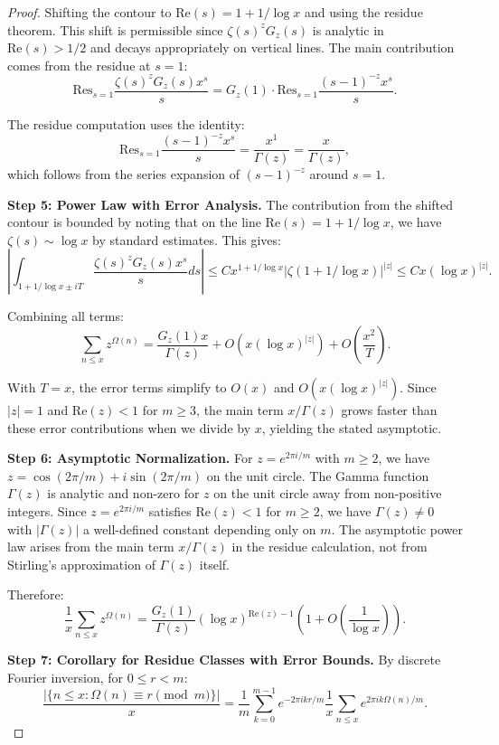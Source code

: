\documentclass[12pt]{article}
\theoremstyle{definition}
\theoremstyle{remark}
\begin{document}
\begin{proof}
Shifting the contour to $\mathrm{Re}(s) = 1 + 1/\log x$ and using the residue theorem. This shift is permissible since $\zeta(s)^z G_z(s)$ is analytic in $\mathrm{Re}(s) > 1/2$ and decays appropriately on vertical lines. The main contribution comes from the residue at $s=1$:
\[
\text{Res}_{s=1} \frac{\zeta(s)^z G_z(s) x^s}{s} = G_z(1) \cdot \text{Res}_{s=1} \frac{(s-1)^{-z} x^s}{s}.
\]

The residue computation uses the identity:
\[
\text{Res}_{s=1} \frac{(s-1)^{-z} x^s}{s} = \frac{x^1}{\Gamma(z)} = \frac{x}{\Gamma(z)},
\]
which follows from the series expansion of $(s-1)^{-z}$ around $s = 1$.

\noindent\textbf{Step 5: Power Law with Error Analysis.}
The contribution from the shifted contour is bounded by noting that on the line $\mathrm{Re}(s) = 1 + 1/\log x$, we have $\zeta(s) \sim \log x$ by standard estimates. This gives:
\[
\left|\int_{1+1/\log x \pm iT} \frac{\zeta(s)^z G_z(s) x^s}{s} ds\right| \leq C x^{1+1/\log x} |\zeta(1+1/\log x)|^{|z|} \leq C x (\log x)^{|z|}.
\]

Combining all terms:
\[
\sum_{n \leq x} z^{\Omega(n)} = \frac{G_z(1) x}{\Gamma(z)} + O\left(x (\log x)^{|z|}\right) + O\left(\frac{x^2}{T}\right).
\]

With $T = x$, the error terms simplify to $O(x)$ and $O(x(\log x)^{|z|})$. Since $|z| = 1$ and $\mathrm{Re}(z) < 1$ for $m \geq 3$, the main term $x/\Gamma(z)$ grows faster than these error contributions when we divide by $x$, yielding the stated asymptotic.

\noindent\textbf{Step 6: Asymptotic Normalization.}
For $z = e^{2\pi i/m}$ with $m \geq 2$, we have $z = \cos(2\pi/m) + i\sin(2\pi/m)$ on the unit circle. The Gamma function $\Gamma(z)$ is analytic and non-zero for $z$ on the unit circle away from non-positive integers. Since $z = e^{2\pi i/m}$ satisfies $\mathrm{Re}(z) < 1$ for $m \geq 2$, we have $\Gamma(z) \neq 0$ with $|\Gamma(z)|$ a well-defined constant depending only on $m$. The asymptotic power law arises from the main term $x/\Gamma(z)$ in the residue calculation, not from Stirling's approximation of $\Gamma(z)$ itself.

Therefore:
\[
\frac{1}{x}\sum_{n \leq x} z^{\Omega(n)} = \frac{G_z(1)}{\Gamma(z)}(\log x)^{\mathrm{Re}(z) - 1}\left(1 + O\left(\frac{1}{\log x}\right)\right).
\]

\noindent\textbf{Step 7: Corollary for Residue Classes with Error Bounds.}
By discrete Fourier inversion, for $0 \leq r < m$:
\[
\frac{|\{n \leq x : \Omega(n) \equiv r \pmod{m}\}|}{x} = \frac{1}{m} \sum_{k=0}^{m-1} e^{-2\pi ikr/m} \frac{1}{x}\sum_{n \leq x} e^{2\pi ik\Omega(n)/m}.
\]


\end{proof}
\end{document}
